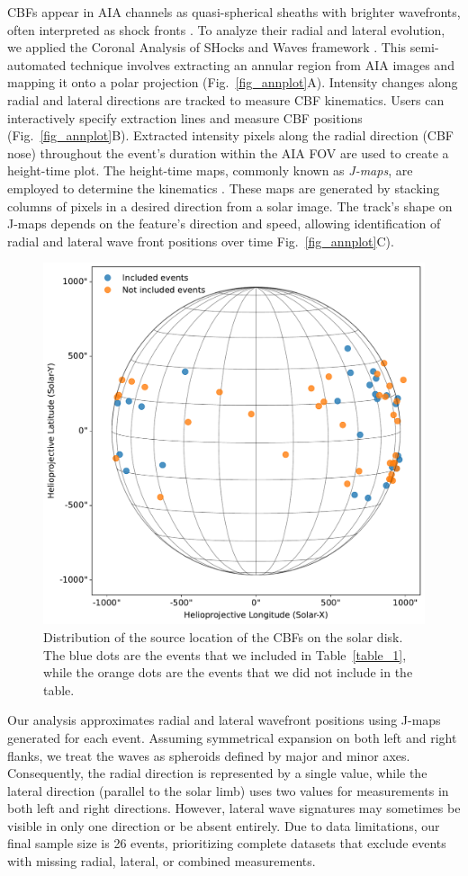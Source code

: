 CBFs appear in AIA channels as quasi-spherical sheaths with brighter wavefronts, often interpreted as shock fronts \citep{vourlidas_2003, ontiveros_2009, kozarev_2011, ma_2011}.
To analyze their radial and lateral evolution, we applied the Coronal Analysis of SHocks and Waves framework \citep[CASHeW]{kozarev_2017}. This semi-automated technique involves extracting an annular region from AIA images and mapping it onto a polar projection (Fig.~\ref{fig_annplot}A). Intensity changes along radial and lateral directions are tracked to measure CBF kinematics. Users can interactively specify extraction lines and measure CBF positions (Fig.~\ref{fig_annplot}B). Extracted intensity pixels along the radial direction (CBF nose) throughout the event's duration within the AIA FOV are used to create a height-time plot. The height-time maps, commonly known as \textit{J-maps}, are employed to determine the kinematics \citep{sheeley_1999}. These maps are generated by stacking columns of pixels in a desired direction from a solar image. The track's shape on J-maps depends on the feature's direction and speed, allowing identification of radial and lateral wave front positions over time Fig.~\ref{fig_annplot}C).

\begin{figure}[!htp] %
	\centerline{\includegraphics[width=0.7\columnwidth]{chapter2/figs/events_coords.pdf}}
	\caption{Distribution of the source location of the CBFs on the solar disk. The blue dots are the events that we included in Table~\ref{table_1}, while the orange dots are the events that we did not include in the table.}
	\label{fig_solardisk}
\end{figure}

Our analysis approximates radial and lateral wavefront positions using J-maps generated for each event. Assuming symmetrical expansion on both left and right flanks, we treat the waves as spheroids defined by major and minor axes. Consequently, the radial direction is represented by a single value, while the lateral direction (parallel to the solar limb) uses two values for measurements in both left and right directions. However, lateral wave signatures may sometimes be visible in only one direction or be absent entirely.
Due to data limitations, our final sample size is 26 events, prioritizing complete datasets that exclude events with missing radial, lateral, or combined measurements.

